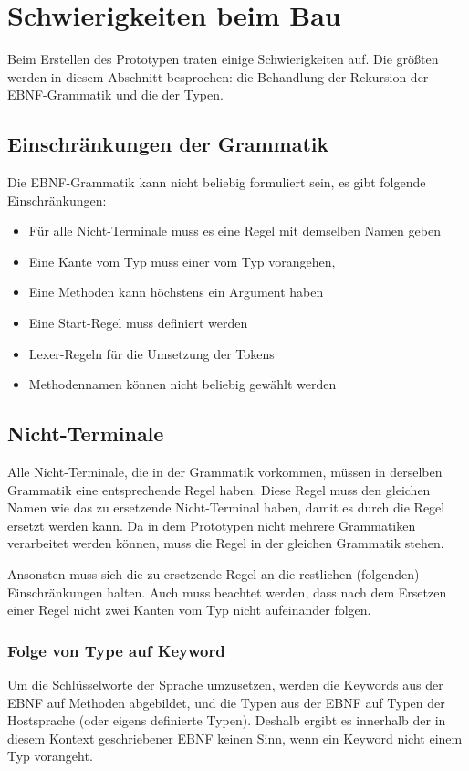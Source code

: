 \documentclass[../InterneDSLs.tex]{subfiles}
\begin{document}
\section{Schwierigkeiten beim Bau}
Beim Erstellen des Prototypen traten einige Schwierigkeiten auf. Die größten werden in diesem Abschnitt besprochen: die Behandlung der Rekursion der EBNF-Grammatik und die der Typen.

\subsection{Einschränkungen der Grammatik}
Die EBNF-Grammatik kann nicht beliebig formuliert sein, es gibt folgende Einschränkungen:
\begin{itemize}
	\item Für alle Nicht-Terminale muss es eine Regel mit demselben Namen geben
	\item Eine Kante vom Typ  muss einer vom Typ  vorangehen,
	\item Eine Methoden kann höchstens ein Argument haben
	\item Eine Start-Regel muss definiert werden
	\item Lexer-Regeln für die Umsetzung der Tokens
	\item Methodennamen können nicht beliebig gewählt werden
\end{itemize}

\subsection{Nicht-Terminale}
Alle Nicht-Terminale, die in der Grammatik vorkommen, müssen in derselben Grammatik eine entsprechende Regel haben. Diese Regel muss den gleichen Namen wie das zu ersetzende Nicht-Terminal haben, damit es durch die Regel ersetzt werden kann. Da in dem Prototypen nicht mehrere Grammatiken verarbeitet werden können, muss die Regel in der gleichen Grammatik stehen.

Ansonsten muss sich die zu ersetzende Regel an die restlichen (folgenden) Einschränkungen halten. Auch muss beachtet werden, dass nach dem Ersetzen einer Regel nicht zwei Kanten vom Typ  nicht aufeinander folgen.

\subsubsection{Folge von Type auf Keyword}\label{SEC:TypeFollowsKeyword}
Um die Schlüsselworte der Sprache umzusetzen, werden die Keywords aus der EBNF auf Methoden abgebildet, und die Typen aus der EBNF auf Typen der Hostsprache (oder eigens definierte Typen). Deshalb ergibt es innerhalb der in diesem Kontext geschriebener EBNF keinen Sinn, wenn ein Keyword nicht einem Typ vorangeht.
\end{document}
